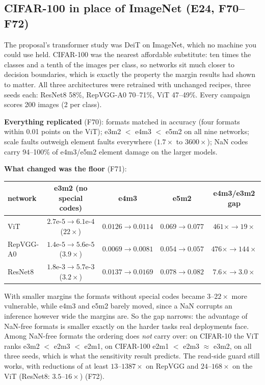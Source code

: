 \subsection{CIFAR-100 in place of ImageNet (E24, F70--F72)}
The proposal's transformer study was DeiT on ImageNet, which no machine you could use held. CIFAR-100 was the nearest affordable substitute: ten times the classes and a tenth of the images per class, so networks sit much closer to decision boundaries, which is exactly the property the margin results had shown to matter. All three architectures were retrained with unchanged recipes, three seeds each:
ResNet8 58\%, RepVGG-A0 70--71\%, ViT 47--49\%. Every campaign scores 200 images (2 per class).

\textbf{Everything replicated} (F70): formats matched in accuracy (four formats within 0.01 points on the ViT); e3m2 $<$ e4m3 $<$ e5m2 on all nine networks; scale faults outweigh element faults everywhere ($1.7\times$ to $3600\times$); NaN codes carry 94--100\% of e4m3/e5m2 element damage on the larger models.

\textbf{What changed was the floor} (F71):
\begin{center}
\small
\begin{tabular}{lcccc}
\toprule
network & e3m2 (no special codes) & e4m3 & e5m2 & e4m3/e3m2 gap \\
\midrule
ViT & $2.7\text{e-}5\to6.1\text{e-}4$ ($22\times$) & $0.0126\to0.0114$ & $0.069\to0.077$ & $461\times\to19\times$ \\
RepVGG-A0 & $1.4\text{e-}5\to5.6\text{e-}5$ ($3.9\times$) & $0.0069\to0.0081$ & $0.054\to0.057$ & $476\times\to144\times$ \\
ResNet8 & $1.8\text{e-}3\to5.7\text{e-}3$ ($3.2\times$) & $0.0137\to0.0169$ & $0.078\to0.082$ & $7.6\times\to3.0\times$ \\
\bottomrule
\end{tabular}
\end{center}
With smaller margins the formats without special codes became $3$--$22\times$ more vulnerable, while e4m3 and e5m2 barely moved, since a NaN corrupts an inference however wide the margins are. So the gap narrows: the advantage of NaN-free formats is smaller exactly on the harder tasks real deployments face. Among NaN-free formats the ordering does \emph{not} carry over:
on CIFAR-10 the ViT ranks e3m2 $<$ e2m3 $<$ e2m1, on CIFAR-100 e2m1 $<$ e2m3 $\approx$ e3m2, on all three seeds, which is what the sensitivity result predicts. The read-side guard still works, with reductions of at least $13$--$1387\times$ on RepVGG and $24$--$168\times$ on the ViT (ResNet8: $3.5$--$16\times$) (F72).


